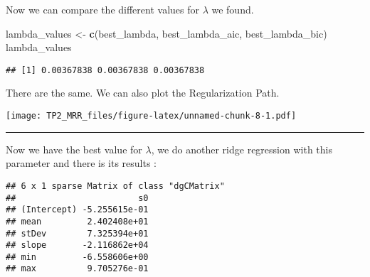 \documentclass[
]{article}
\newenvironment{Shaded}{\begin{snugshade}}{\end{snugshade}}
\newcommand{\AttributeTok}[1]{\textcolor[rgb]{0.13,0.29,0.53}{#1}}
\newcommand{\DecValTok}[1]{\textcolor[rgb]{0.00,0.00,0.81}{#1}}
\newcommand{\FunctionTok}[1]{\textcolor[rgb]{0.13,0.29,0.53}{\textbf{#1}}}
\newcommand{\NormalTok}[1]{#1}
\newcommand{\OtherTok}[1]{\textcolor[rgb]{0.56,0.35,0.01}{#1}}
\newcommand{\SpecialCharTok}[1]{\textcolor[rgb]{0.81,0.36,0.00}{\textbf{#1}}}
\newcommand{\StringTok}[1]{\textcolor[rgb]{0.31,0.60,0.02}{#1}}
\begin{document}
Now we can compare the different values for \(\lambda\) we found.

\begin{Shaded}
\begin{Highlighting}[]
\NormalTok{lambda\_values }\OtherTok{\textless{}{-}} \FunctionTok{c}\NormalTok{(best\_lambda, best\_lambda\_aic, best\_lambda\_bic)}
\NormalTok{lambda\_values}
\end{Highlighting}
\end{Shaded}

\begin{verbatim}
## [1] 0.00367838 0.00367838 0.00367838
\end{verbatim}

There are the same. We can also plot the Regularization Path.

\begin{Shaded}
\end{Shaded}

\texttt{[image: TP2\_MRR\_files/figure-latex/unnamed-chunk-8-1.pdf]}

\begin{center}\rule{0.5\linewidth}{0.5pt}\end{center}

Now we have the best value for \(\lambda\), we do another ridge
regression with this parameter and there is its results :

\begin{verbatim}
## 6 x 1 sparse Matrix of class "dgCMatrix"
##                        s0
## (Intercept) -5.255615e-01
## mean         2.402408e+01
## stDev        7.325394e+01
## slope       -2.116862e+04
## min         -6.558606e+00
## max          9.705276e-01
\end{verbatim}
\end{document}
